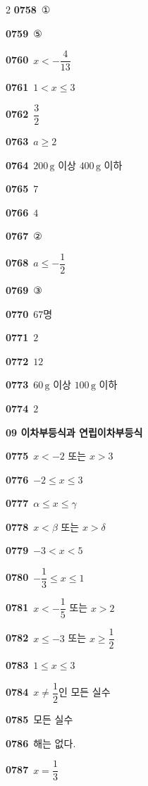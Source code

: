 \documentclass[10pt,a4paper]{article}
\begin{document}
\begin{multicols}{2}
\noindent\textbf{0758}\ ①\par
\noindent\textbf{0759}\ ⑤\par
\noindent\textbf{0760}\ $x<-\dfrac{4}{13}$\par
\noindent\textbf{0761}\ $1<x\le 3$\par
\noindent\textbf{0762}\ $\dfrac{3}{2}$\par
\noindent\textbf{0763}\ $a\ge 2$\par
\noindent\textbf{0764}\ $200\,\mathrm{g}$ 이상 $400\,\mathrm{g}$ 이하\par
\noindent\textbf{0765}\ $7$\par
\noindent\textbf{0766}\ $4$\par
\noindent\textbf{0767}\ ②\par
\noindent\textbf{0768}\ $a\le -\dfrac{1}{2}$\par
\noindent\textbf{0769}\ ③\par
\noindent\textbf{0770}\ $67$명\par
\noindent\textbf{0771}\ $2$\par
\noindent\textbf{0772}\ $12$\par
\noindent\textbf{0773}\ $60\,\mathrm{g}$ 이상 $100\,\mathrm{g}$ 이하\par
\noindent\textbf{0774}\ $2$\par
\noindent\textbf{09 이차부등식과 연립이차부등식}\par\smallskip
\noindent\textbf{0775}\ $x<-2$ 또는 $x>3$\par
\noindent\textbf{0776}\ $-2\le x\le 3$\par
\noindent\textbf{0777}\ $\alpha\le x\le\gamma$\par
\noindent\textbf{0778}\ $x<\beta$ 또는 $x>\delta$\par
\noindent\textbf{0779}\ $-3<x<5$\par
\noindent\textbf{0780}\ $-\dfrac{1}{3}\le x\le 1$\par
\noindent\textbf{0781}\ $x<-\dfrac{1}{5}$ 또는 $x>2$\par
\noindent\textbf{0782}\ $x\le -3$ 또는 $x\ge\dfrac{1}{2}$\par
\noindent\textbf{0783}\ $1\le x\le 3$\par
\noindent\textbf{0784}\ $x\ne\dfrac{1}{2}$인 모든 실수\par
\noindent\textbf{0785}\ 모든 실수\par
\noindent\textbf{0786}\ 해는 없다.\par
\noindent\textbf{0787}\ $x=\dfrac{1}{3}$\par

\end{multicols}
\end{document}
